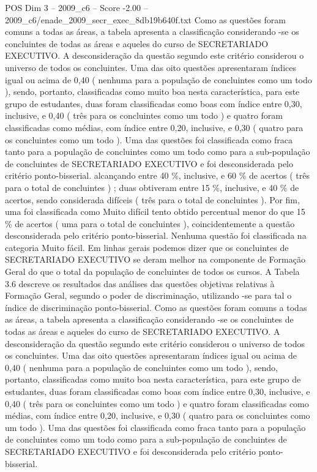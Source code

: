 \begin{textsample}{POS Dim 3 – 2009\_c6 – Score -2.00 – 2009\_c6/enade\_2009\_secr\_exec\_8db19b640f.txt}
Como as questões foram comuns a todas as áreas, a tabela apresenta a classificação considerando -se os concluintes de todas as áreas e aqueles do curso de SECRETARIADO EXECUTIVO.
A desconsideração da questão segundo este critério considerou o universo de todos os concluintes.
Uma das oito questões apresentaram índices igual ou acima de 0,40 ( nenhuma para a população de concluintes como um todo ), sendo, portanto, classificadas como muito boa nesta característica, para este grupo de estudantes, duas foram classificadas como boas com índice entre 0,30, inclusive, e 0,40 ( três para os concluintes como um todo ) e quatro foram classificadas como médias, com índice entre 0,20, inclusive, e 0,30 ( quatro para os concluintes como um todo ).
Uma das questões foi classificada como fraca tanto para a população de concluintes como um todo como para a sub-população de concluintes de SECRETARIADO EXECUTIVO e foi desconsiderada pelo critério ponto-bisserial. alcançando entre 40 \%, inclusive, e 60 \% de acertos ( três para o total de concluintes ) ; duas obtiveram entre 15 \%, inclusive, e 40 \% de acertos, sendo considerada difíceis ( três para o total de concluintes ).
Por fim, uma foi classificada como Muito difícil tento obtido percentual menor do que 15 \% de acertos ( uma para o total de concluintes ), coincidentemente a questão desconsiderada pelo critério ponto-bisserial.
Nenhuma questão foi classificada na categoria Muito fácil.
Em linhas gerais podemos dizer que os concluintes de SECRETARIADO EXECUTIVO se deram melhor na componente de Formação Geral do que o total da população de concluintes de todos os cursos.
A Tabela 3.6 descreve os resultados das análises das questões objetivas relativas à Formação Geral, segundo o poder de discriminação, utilizando -se para tal o índice de discriminação ponto-bisserial.
Como as questões foram comuns a todas as áreas, a tabela apresenta a classificação considerando -se os concluintes de todas as áreas e aqueles do curso de SECRETARIADO EXECUTIVO.
A desconsideração da questão segundo este critério considerou o universo de todos os concluintes.
Uma das oito questões apresentaram índices igual ou acima de 0,40 ( nenhuma para a população de concluintes como um todo ), sendo, portanto, classificadas como muito boa nesta característica, para este grupo de estudantes, duas foram classificadas como boas com índice entre 0,30, inclusive, e 0,40 ( três para os concluintes como um todo ) e quatro foram classificadas como médias, com índice entre 0,20, inclusive, e 0,30 ( quatro para os concluintes como um todo ).
Uma das questões foi classificada como fraca tanto para a população de concluintes como um todo como para a sub-população de concluintes de SECRETARIADO EXECUTIVO e foi desconsiderada pelo critério ponto-bisserial.

\end{textsample}
